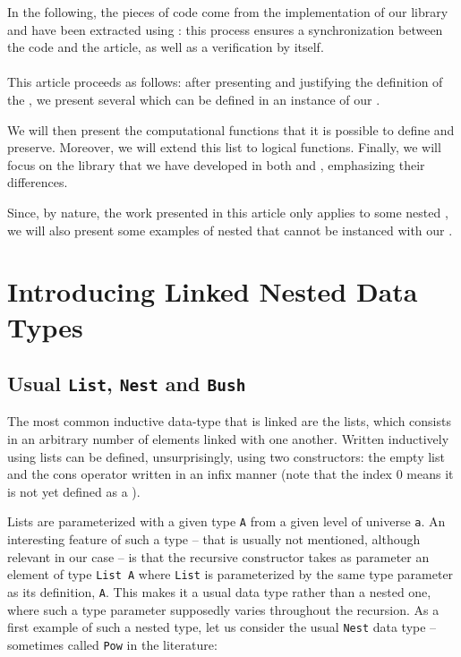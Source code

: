\documentclass[a4paper,UKenglish,cleveref, autoref, thm-restate]{lipics}
\begin{document}
In the following, the pieces of code come from the \agda implementation of our library and have been extracted using \lagda : this process ensures a synchronization between the code and the article, as well as a verification by \agda itself. \\
 \\
This article proceeds as follows: after presenting and justifying the definition of the \linearsFull, we present several \datatypes which can be defined in an instance of our \linearsFull.

We will then present the computational functions that it is possible to define and preserve.
Moreover, we will extend this list to logical functions.
Finally, we will focus on the library that we have developed in both \agda and \coq, emphasizing their differences.

Since, by nature, the work presented in this article only applies to some nested \datatypes, we will also present some examples of nested \datatypes that cannot be instanced with our \linearsFull.



\newpage

\section{Introducing Linked Nested Data Types}\label{sec:lndts}

\subsection{Usual \texttt{List}, \texttt{Nest} and \texttt{Bush}}\label{ssec:usuallnb}

The most common inductive data-type that is linked are the lists, which consists in an arbitrary number of elements linked with one another. Written inductively using \agda lists can be defined, unsurprisingly, using two constructors: the empty list and the cons operator written in an infix manner (note that the index 0 means it is not yet defined as a \linear).

\exampleList

Lists are parameterized with a given type \texttt{A} from a given level of universe \texttt{a}. An interesting feature of such a type -- that is usually not mentioned, although relevant in our case -- is that the recursive constructor takes as parameter an element of type \texttt{List A} where \texttt{List} is parameterized by the same type parameter as its definition, \texttt{A}. This makes it a usual data type rather than a nested one, where such a type parameter supposedly varies throughout the recursion. As a first example of such a nested type, let us consider the usual \texttt{Nest} data type -- sometimes called \texttt{Pow} in the literature: 
\end{document}
